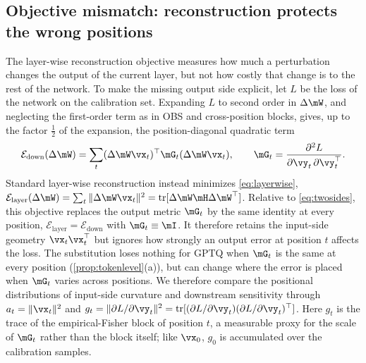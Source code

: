 \subsection{Objective mismatch: reconstruction protects the wrong positions}
\label{sec:mechanism:mismatch}
The layer-wise reconstruction objective measures how much a perturbation changes the output of the current layer, but not how costly that change is to the rest of the network.
To make the missing output side explicit, let $L$ be the loss of the network on the calibration set.
Expanding $L$ to second order in $\Delta\mW$, and neglecting the first-order term as in OBS and cross-position blocks, gives, up to the factor $\tfrac12$ of the expansion, the position-diagonal quadratic term
\begin{equation}
\label{eq:twosides}
\mathcal{E}_{\mathrm{down}}(\Delta\mW)
=
\sum_t
(\Delta\mW\vx_t)^\top
\mG_t
(\Delta\mW\vx_t),
\qquad
\mG_t
=
\frac{\partial^2 L}
     {\partial\vy_t\,\partial\vy_t^\top}.
\end{equation}
Standard layer-wise reconstruction instead minimizes \cref{eq:layerwise}, $\mathcal{E}_{\mathrm{layer}}(\Delta\mW)=\sum_t\|\Delta\mW\vx_t\|^2=\operatorname{tr}[\Delta\mW\hess\Delta\mW^\top]$.
Relative to \cref{eq:twosides}, this objective replaces the output metric $\mG_t$ by the same identity at every position, $\mathcal{E}_{\mathrm{layer}}=\mathcal{E}_{\mathrm{down}}$ with $\mG_t\equiv\mI$. It therefore retains the input-side geometry $\vx_t\vx_t^\top$ but ignores how strongly an output error at position $t$ affects the loss.
The substitution loses nothing for GPTQ when $\mG_t$ is the same at every position (\cref{prop:tokenlevel}(a)), but can change where the error is placed when $\mG_t$ varies across positions. We therefore compare the positional distributions of input-side curvature and downstream sensitivity through $a_t=\|\vx_t\|^2$ and $g_t=\|\partial L/\partial\vy_t\|^2=\operatorname{tr}[(\partial L/\partial\vy_t)(\partial L/\partial\vy_t)^{\top}]$.
Here $g_t$ is the trace of the empirical-Fisher block of position $t$, a measurable proxy for the scale of $\mG_t$ rather than the block itself; like $\vx_0$, $g_0$ is accumulated over the calibration samples.


